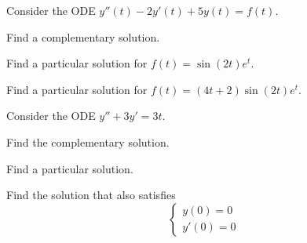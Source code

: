 \bookonlynewpage

\question \label{2nd:ode2}
	Consider the ODE \quad $y''(t) -2y'(t)+5y(t) = f(t)$. %
\begin{parts}
	\item Find a complementary solution.
	\item Find a particular solution for $f(t) = \sin(2t)e^t$.
	\item Find a particular solution for $f(t) = (4t+2)\sin(2t)e^t$.
\end{parts}




\bookonlynewpage


\question \label{2nd:ode3}
	Consider the ODE \quad $y'' + 3y' = 3t$.
\begin{parts}
	\item Find the complementary solution.
	\item Find a particular solution.
	\item Find the solution that also satisfies
	$$ \begin{cases}
		y(0)=0 \\
		y'(0)=0
	\end{cases}$$
\end{parts}


